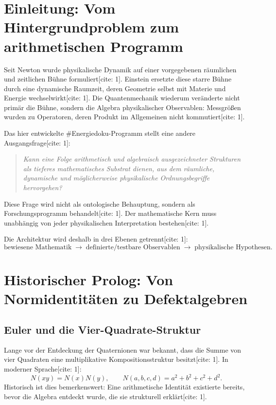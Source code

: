 \documentclass[11pt,a4paper]{article}
\begin{document}
\begin{abstract}
Der Artikel verbindet diese Konstruktion historisch mit Euler, Hamilton, Graves/Cayley, Hurwitz und der nichtkommutativen Operatoralgebra der Quantenmechanik und schließt mit einer dreistufigen Claim-Wall[cite: 1]:
\[
\texttt{PROVED}\;\longrightarrow\;\texttt{TESTABLE}\;\longrightarrow\;\texttt{PHYSICAL HYPOTHESIS}.
\]
\end{abstract}

\newpage
\tableofcontents
\vspace{1cm}

\section{Einleitung: Vom Hintergrundproblem zum arithmetischen Programm}
Seit Newton wurde physikalische Dynamik auf einer vorgegebenen räumlichen und zeitlichen Bühne formuliert[cite: 1]. Einstein ersetzte diese starre Bühne durch eine dynamische Raumzeit, deren Geometrie selbst mit Materie und Energie wechselwirkt[cite: 1]. Die Quantenmechanik wiederum veränderte nicht primär die Bühne, sondern die Algebra physikalischer Observablen: Messgrößen wurden zu Operatoren, deren Produkt im Allgemeinen nicht kommutiert[cite: 1].

Das hier entwickelte \#Energiedoku-Programm stellt eine andere Ausgangsfrage[cite: 1]:
\begin{quote}
\emph{Kann eine Folge arithmetisch und algebraisch ausgezeichneter Strukturen als tieferes mathematisches Substrat dienen, aus dem räumliche, dynamische und möglicherweise physikalische Ordnungsbegriffe hervorgehen?}
\end{quote}
Diese Frage wird nicht als ontologische Behauptung, sondern als Forschungsprogramm behandelt[cite: 1]. Der mathematische Kern muss unabhängig von jeder physikalischen Interpretation bestehen[cite: 1].

Die Architektur wird deshalb in drei Ebenen getrennt[cite: 1]:
\[
\boxed{\text{bewiesene Mathematik}\;\longrightarrow\;\text{definierte/testbare Observablen}\;\longrightarrow\;\text{physikalische Hypothesen}.}
\]

\section{Historischer Prolog: Von Normidentitäten zu Defektalgebren}
\subsection{Euler und die Vier-Quadrate-Struktur}
Lange vor der Entdeckung der Quaternionen war bekannt, dass die Summe von vier Quadraten eine multiplikative Kompositionsstruktur besitzt[cite: 1]. In moderner Sprache[cite: 1]:
\[
N(xy)=N(x)N(y),\qquad N(a,b,c,d)=a^2+b^2+c^2+d^2.
\]
Historisch ist dies bemerkenswert: Eine arithmetische Identität existierte bereits, bevor die Algebra entdeckt wurde, die sie strukturell erklärt[cite: 1].
\end{document}
